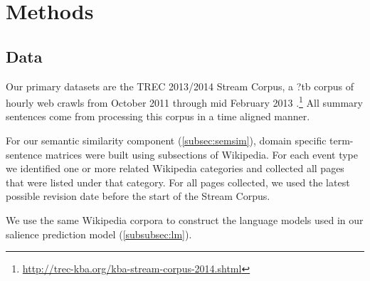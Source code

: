 
\section{Methods}
\label{sec:methods}
\subsection{Data}\label{sec:data}

Our primary datasets are the TREC 2013/2014 Stream Corpus, 
a ?tb corpus of hourly 
web crawls from October 2011
through mid February 2013
\cite{frank2012building}.\footnote{\url{http://trec-kba.org/kba-stream-corpus-2014.shtml}}
All summary sentences come from processing this
corpus in a time aligned manner.

For our semantic similarity component (\cref{subsec:semsim}),
domain specific term-sentence matrices were built using subsections of
Wikipedia. For each event type we identified one or more related Wikipedia
categories and collected all pages that were listed under that category.
For all pages collected, we used the latest possible revision date before the
start of the Stream Corpus.

We use the same Wikipedia corpora to construct the language models used
in our salience prediction model (\cref{subsubsec:lm}). 

